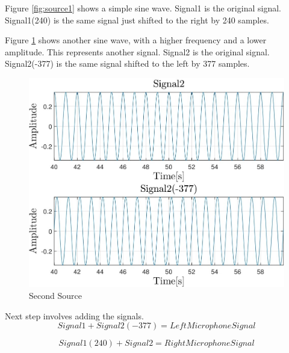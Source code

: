 Figure \ref{fig:source1} shows a simple sine wave. Signal1 is the original signal. Signal1(240) is the 
same signal just shifted to the right by 240 samples.
\newpage

Figure \ref{fig:source2} shows another sine wave, with a higher frequency and a lower amplitude. This 
represents another signal. Signal2 is the original signal. Signal2(-377) is the same signal shifted to 
the left by 377 samples.

\begin{figure}[htp]
	\centering
	\includegraphics[width=\textwidth]{Illustrations/source2.jpg}
	\caption{Second Source}
	\label{fig:source2}
\end{figure}
Next step involves adding the signals.
\begin{equation}
	Signal1 + Signal2(-377) = LeftMicrophoneSignal
	\label{eq:leftMicrophone}
\end{equation}

\begin{equation}
	Signal1(240) + Signal2 = RightMicrophoneSignal
	\label{eq:rightMicrophone}
\end{equation}

